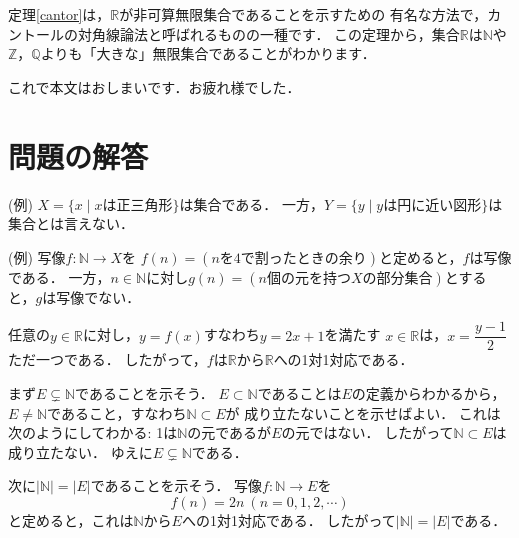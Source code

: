 \documentclass[./main]{subfiles} %
\theoremstyle{definition}
\begin{document}
定理\ref{cantor}は，$\mathbb{R}$が非可算無限集合であることを示すための
有名な方法で，カントールの対角線論法と呼ばれるものの一種です．
この定理から，集合$\mathbb{R}$は$\mathbb{N}$や
$\mathbb{Z}$，$\mathbb{Q}$よりも「大きな」無限集合であることがわかります．

これで本文はおしまいです．お疲れ様でした．

\section{問題の解答}
(例)
$X=\{x\mid xは正三角形\}$は集合である．
一方，$Y=\{y\mid yは円に近い図形\}$は集合とは言えない．

(例)
写像$f\colon\mathbb{N}\to X$を
$f(n)=(nを4で割ったときの余り)$と定めると，$f$は写像である．
一方，$n\in\mathbb{N}$に対し$g(n)=(n個の元を持つXの部分集合)$とすると，$g$は写像でない．

任意の$y\in\mathbb{R}$に対し，$y=f(x)$すなわち$y=2x+1$を満たす
$x\in\mathbb{R}$は，$x=\dfrac{y-1}{2}$ただ一つである．
したがって，$f$は$\mathbb{R}$から$\mathbb{R}$への1対1対応である．

まず$E\subsetneq\mathbb{N}$であることを示そう．
$E\subset\mathbb{N}$であることは$E$の定義からわかるから，
$E\neq\mathbb{N}$であること，すなわち$\mathbb{N}\subset E$が
成り立たないことを示せばよい．
これは次のようにしてわかる:
1は$\mathbb{N}$の元であるが$E$の元ではない．
したがって$\mathbb{N}\subset E$は成り立たない．
ゆえに$E\subsetneq\mathbb{N}$である．

次に$|\mathbb{N}|=|E|$であることを示そう．
写像$f\colon\mathbb{N}\to E$を
\[
f(n)=2n\ (n=0,1,2,\cdots)
\]
と定めると，これは$\mathbb{N}$から$E$への1対1対応である．
したがって$|\mathbb{N}|=|E|$である．
\end{document}
